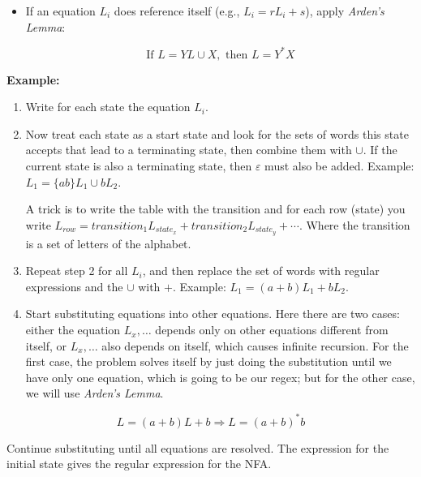 \begin{enumerate}
\begin{itemize}
        \item If an equation \(L_i\) does reference itself (e.g., \(L_i = r L_i + s\)), apply 
        \emph{Arden's Lemma}:  
        
        \[
            \text{If } L = YL \cup X, \text{ then } L = Y^*X
        \]
    
    \end{itemize}

    \textbf{Example:}  \begin{enumerate}
    
    \item Write for each state the equation \(L_i\).
    
    \item Now treat each state as a start state and look for the sets of words this state accepts that lead 
          to a terminating state, then combine them with \(\cup\). If the current state is also a terminating 
          state, then \(\varepsilon\) must also be added. Example: \(L_1 = \{ab\}L_1 \cup b L_2\).

          A trick is to write the table with the transition and for each row (state) you write 
          \(L_{row} = transition_1 L_{state_x} + transition_2 L_{state_y} + \cdots \). Where the transition is 
          a set of letters of the alphabet.
          
    \item Repeat step 2 for all \(L_i\), and then replace the set of words with regular expressions and the 
           \(\cup\) with \(+\). Example: \(L_1 = (a+b)L_1 + b L_2\).
    
    \item Start substituting equations into other equations. Here there are two cases: either the  
          equation \(L_x, \dots\) depends only on other equations different from itself, or \(L_x, \dots\) also depends on 
          itself, which causes infinite recursion. For the first case, the problem solves itself by just 
          doing the substitution until we have only one equation, which is going to be our regex; but for the 
          other case, we will use \emph{Arden's Lemma}. 

\end{enumerate}

    \[
        L = (a + b) L + b \Rightarrow L = (a + b)^* b
    \]

    Continue substituting until all equations are resolved. The expression for the initial state gives 
    the regular expression for the NFA.

\end{enumerate}



